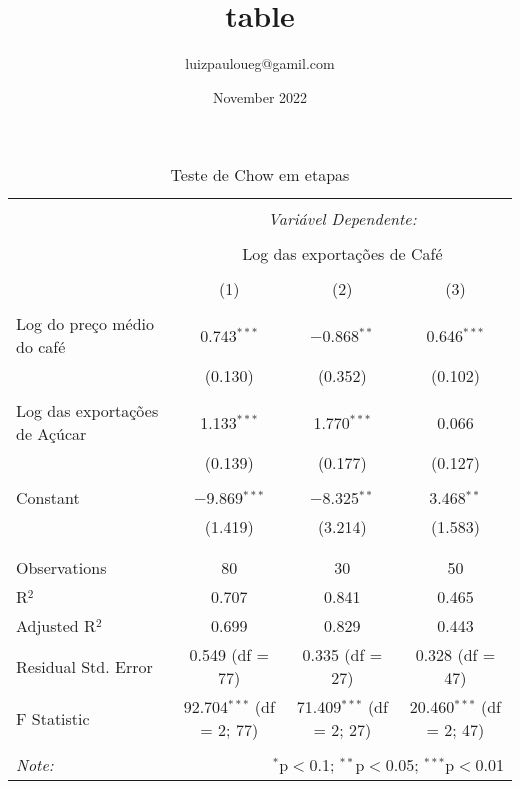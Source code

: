 \documentclass{article}
\title{table}
\author{luizpauloueg@gamil.com}
\date{November 2022}
\begin{document}
\begin{table}[!htbp] \centering 
  \caption{Teste de Chow em etapas} 
  \label{} 
\begin{tabular}{@{\extracolsep{-5pt}}lccc} 
\\[-0.1ex]\hline 
\hline \\[-0.1ex] 
 & \multicolumn{3}{c}{\textit{Variável Dependente:}} \\ 
\cline{2-4} 
\\[-1.8ex] & \multicolumn{3}{c}{Log das exportações de Café} \\ 
\\[-1.8ex] & (1) & (2) & (3)\\ 
\hline \\[-0.1ex] 
 Log do preço médio do café & 0.743$^{***}$ & $-$0.868$^{**}$ & 0.646$^{***}$ \\ 
  & (0.130) & (0.352) & (0.102) \\ 
  & & & \\ 
 Log das exportações de Açúcar & 1.133$^{***}$ & 1.770$^{***}$ & 0.066 \\ 
  & (0.139) & (0.177) & (0.127) \\ 
  & & & \\ 
 Constant & $-$9.869$^{***}$ & $-$8.325$^{**}$ & 3.468$^{**}$ \\ 
  & (1.419) & (3.214) & (1.583) \\ 
  & & & \\ 
\hline \\[2ex] 
Observations & 80 & 30 & 50 \\ 
R$^{2}$ & 0.707 & 0.841 & 0.465 \\ 
Adjusted R$^{2}$ & 0.699 & 0.829 & 0.443 \\ 
Residual Std. Error & 0.549 (df = 77) & 0.335 (df = 27) & 0.328 (df = 47) \\ 
F Statistic & 92.704$^{***}$ (df = 2; 77) & 71.409$^{***}$ (df = 2; 27) & 20.460$^{***}$ (df = 2; 47) \\ 
\hline 
\hline \\[-0.1ex] 
\textit{Note:}  & \multicolumn{3}{r}{$^{*}$p$<$0.1; $^{**}$p$<$0.05; $^{***}$p$<$0.01} \\ 
\end{tabular} 
\end{table} 
\end{document}
